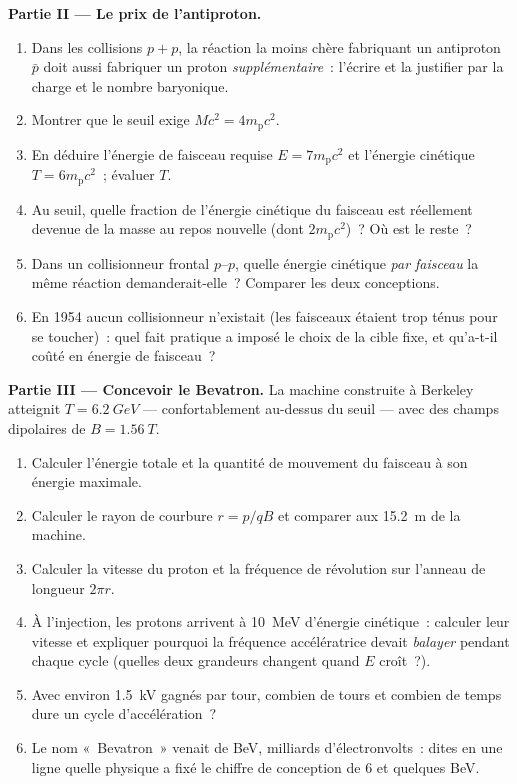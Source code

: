 \begin{problem}
\medskip\noindent\textbf{Partie II --- Le prix de l'antiproton.}
\begin{enumerate}[resume]
  \item Dans les collisions $p + p$, la réaction la moins chère
        fabriquant un antiproton $\bar p$ doit aussi fabriquer un
        proton \emph{supplémentaire}~: l'écrire et la justifier par
        la charge et le nombre baryonique.
  \item Montrer que le seuil exige $Mc^2 = 4m_{\text{p}}c^2$.
  \item En déduire l'énergie de faisceau requise $E = 7m_{\text{p}}c^2$
        et l'énergie cinétique $T = 6m_{\text{p}}c^2$~; évaluer $T$.
  \item Au seuil, quelle fraction de l'énergie cinétique du faisceau
        est réellement devenue de la masse au repos nouvelle (dont
        $2m_{\text{p}}c^2$)~? Où est le reste~?
  \item Dans un collisionneur frontal $p$--$p$, quelle énergie
        cinétique \emph{par faisceau} la même réaction demanderait-elle~?
        Comparer les deux conceptions.
  \item En 1954 aucun collisionneur n'existait (les faisceaux étaient
        trop ténus pour se toucher)~: quel fait pratique a imposé le
        choix de la cible fixe, et qu'a-t-il coûté en énergie de
        faisceau~?
\end{enumerate}

\medskip\noindent\textbf{Partie III --- Concevoir le Bevatron.}
La machine construite à Berkeley atteignit $T = \qty{6.2}{GeV}$ ---
confortablement au-dessus du seuil --- avec des champs dipolaires de $B =
\qty{1.56}{T}$.
\begin{enumerate}[resume]
  \item Calculer l'énergie totale et la quantité de mouvement du
        faisceau à son énergie maximale.
  \item Calculer le rayon de courbure $r = p/qB$ et comparer aux
        \qty{15.2}{m} de la machine.
  \item Calculer la vitesse du proton et la fréquence de révolution
        sur l'anneau de longueur $2\pi r$.
  \item À l'injection, les protons arrivent à \qty{10}{MeV}
        d'énergie cinétique~: calculer leur vitesse et expliquer
        pourquoi la fréquence accélératrice devait \emph{balayer}
        pendant chaque cycle (quelles deux grandeurs changent quand
        $E$ croît~?).
  \item Avec environ \qty{1.5}{kV} gagnés par tour, combien de tours
        et combien de temps dure un cycle d'accélération~?
  \item Le nom «~Bevatron~» venait de BeV, milliards d'électronvolts~:
        dites en une ligne quelle physique a fixé le chiffre de
        conception de $6$ et quelques BeV.
\end{enumerate}


\end{problem}
